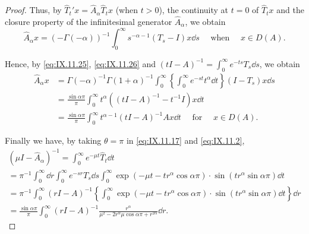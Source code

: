 \begin{proof}
Thus, by $\hat{T}_t' x = \hat{A}_{\alpha} \hat{T}_t x$ (when $t > 0$), the continuity at $t = 0$ of $\hat{T}_t x$ and the closure property of the infinitesimal generator $\hat{A}_{\alpha}$, we obtain 
\[
\hat {A} _{\alpha} x = (- \Gamma (- \alpha)) ^{-1} \int_{0} ^{\infty} s ^{- \alpha -1} (T _{s} - I) x \dd s \quad \text{ when } \quad x \in D (A).
\]

Hence, by \eqref{eq:IX.11.25}, \eqref{eq:IX.11.26} and $(tI - A)^{-1} = \int_{0}^{\infty} e^{-ts} T_s \dd s$, we obtain 
\[
\begin{aligned} \hat {A} _{\alpha} x & = \Gamma (- \alpha) ^{-1} \Gamma (1 + \alpha) ^{-1} \int_{0} ^{\infty} \left\{\int_{0} ^{\infty} e ^{-st} t ^{\alpha} \dd t \right\} (I - T _{s}) x \dd s \\ & = \frac {\sin \alpha \pi}{\pi} \int_{0} ^{\infty} t ^{\alpha} ((t I - A) ^{-1} - t ^{-1} I) x \dd t \\ & = \frac {\sin \alpha \pi}{\pi} \int_{0} ^{\infty} t ^{\alpha -1} (t I - A) ^{-1} A x \dd t \quad \text{ for } \quad x \in D (A). \end{aligned}
\]

Finally we have, by taking $\theta = \pi$ in \eqref{eq:IX.11.17} and \eqref{eq:IX.11.2}, 
\[
\begin{gathered}
(\mu I - \hat {A} _{\alpha}) ^{-1} = \int_{0} ^{\infty} e ^{- \mu t} \hat {T} _{t} \dd t
\\
= \pi^{-1} \int_{0} ^{\infty} \dd r \int_{0} ^{\infty} e ^{-sr} T _{s} \dd s \int_{0} ^{\infty} \exp (- \mu t - t r ^{\alpha} \cos \alpha \pi) \cdot \sin (t r ^{\alpha} \sin \alpha \pi) \dd t
\\
= \pi^{-1} \int_{0} ^{\infty} (r I - A) ^{-1} \left\{\int_{0} ^{\infty} \exp (- \mu t - t r ^{\alpha} \cos \alpha \pi) \cdot \sin (t r ^{\alpha} \sin \alpha \pi) \dd t \right\} \dd r
\\
= \frac {\sin \alpha \pi}{\pi} \int_{0} ^{\infty} (r I - A) ^{-1} \frac {r ^{\alpha}}{\mu^{2} - 2 r ^{\alpha} \mu \cos \alpha \pi + r ^{2 \alpha}} \dd r.
\end{gathered}
\]
\end{proof}

